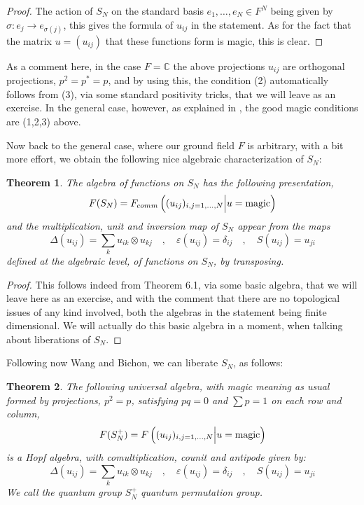 \documentclass[12pt]{amsbook}
\newtheorem{theorem}{Theorem}[chapter]
\begin{document}
\begin{proof}
The action of $S_N$ on the standard basis $e_1,\ldots,e_N\in F^N$ being given by $\sigma:e_j\to e_{\sigma(j)}$, this gives the formula of $u_{ij}$ in the statement. As for the fact that the matrix $u=(u_{ij})$ that these functions form is magic, this is clear.
\end{proof}

As a comment here, in the case $F=\mathbb C$ the above projections $u_{ij}$ are orthogonal projections, $p^2=p^*=p$, and by using this, the condition (2) automatically follows from (3), via some standard positivity tricks, that we will leave as an exercise. In the general case, however, as explained in \cite{bi4}, the good magic conditions are (1,2,3) above.

\bigskip

Now back to the general case, where our ground field $F$ is arbitrary, with a bit more effort, we obtain the following nice algebraic characterization of $S_N$:


\begin{theorem}
The algebra of functions on $S_N$ has the following presentation,
$$F(S_N)=F_{comm}\left((u_{ij})_{i,j=1,\ldots,N}\Big|u={\rm magic}\right)$$
and the multiplication, unit and inversion map of $S_N$ appear from the maps
$$\Delta(u_{ij})=\sum_ku_{ik}\otimes u_{kj}\quad,\quad 
\varepsilon(u_{ij})=\delta_{ij}\quad,\quad 
S(u_{ij})=u_{ji}$$
defined at the algebraic level, of functions on $S_N$, by transposing.
\end{theorem}

\begin{proof}
This follows indeed from Theorem 6.1, via some basic algebra, that we will leave here as an exercise, and with the comment that there are no topological issues of any kind involved, both the algebras in the statement being finite dimensional. We will actually do this basic algebra in a moment, when talking about liberations of $S_N$.
\end{proof}

Following now Wang and Bichon, we can liberate $S_N$, as follows:


\begin{theorem}
The following universal algebra, with magic meaning as usual formed by projections, $p^2=p$, satisfying $pq=0$ and $\sum p=1$ on each row and column,
$$F(S_N^+)=F\left((u_{ij})_{i,j=1,\ldots,N}\Big|u={\rm magic}\right)$$
is a Hopf algebra, with comultiplication, counit and antipode given by:
$$\Delta(u_{ij})=\sum_ku_{ik}\otimes u_{kj}\quad,\quad 
\varepsilon(u_{ij})=\delta_{ij}\quad,\quad 
S(u_{ij})=u_{ji}$$
We call the quantum group $S_N^+$ quantum permutation group.
\end{theorem}
\end{document}
